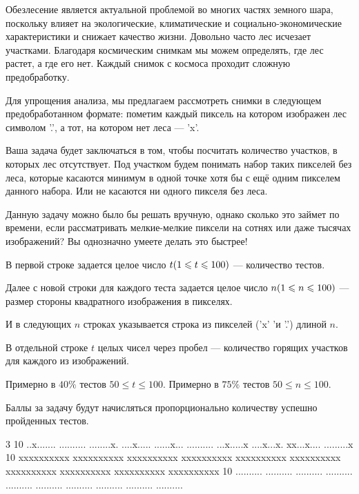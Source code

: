 
Обезлесение является актуальной проблемой во многих частях земного шара, поскольку влияет на 
экологические, климатические и социально-экономические характеристики и снижает качество жизни. 
Довольно часто лес исчезает участками. Благодаря космическим снимкам мы можем определять, 
где лес растет, а где его нет. Каждый снимок с космоса проходит сложную предобработку. 

Для упрощения анализа, мы предлагаем рассмотреть снимки в следующем предобработанном формате: 
пометим каждый пиксель на котором изображен лес символом '.', а тот, на котором нет леса — 'x'.

Ваша задача будет заключаться в том, чтобы посчитать количество участков, в которых лес отсутствует. 
Под участком будем понимать набор таких пикселей без леса, которые касаются минимум в одной точке хотя 
бы с ещё одним пикселем данного набора. Или не касаются ни одного пикселя без леса.

Данную задачу можно было бы решать вручную, однако сколько это займет по времени, если рассматривать 
мелкие-мелкие пиксели на сотнях или даже тысячах изображений? Вы однозначно умеете делать это быстрее!


В первой строке задается целое число $t \space (1 \leq t \leq 100)$  — количество тестов.

Далее с новой строки для каждого теста задается целое число $n\space (1 \leq n \leq 100)$  — размер стороны 
квадратного изображения в пикселях.

И в следующих $n$ строках указывается строка из пикселей ('x' 'и '.') длиной $n$.

\outputfmtSection

В отдельной строке $ t $ целых чисел через пробел — количество горящих участков для каждого из изображений.

\markSection

Примерно в $40\%$  тестов $50 \leq t \leq 100$.  
Примерно в $75\%$  тестов $50 \leq n \leq 100$. 

Баллы за задачу будут начисляться пропорционально количеству успешно пройденных тестов.


\begin{myverbbox}[\small]{\vinput}
3
10
..x.......
..........
........x.
....x.....
......x...
..........
...x.....x
....x...x.
xx...x....
.........x
10
xxxxxxxxxx
xxxxxxxxxx
xxxxxxxxxx
xxxxxxxxxx
xxxxxxxxxx
xxxxxxxxxx
xxxxxxxxxx
xxxxxxxxxx
xxxxxxxxxx
xxxxxxxxxx
10
..........
..........
..........
..........
..........
..........
..........
..........
..........
..........
\end{myverbbox}

